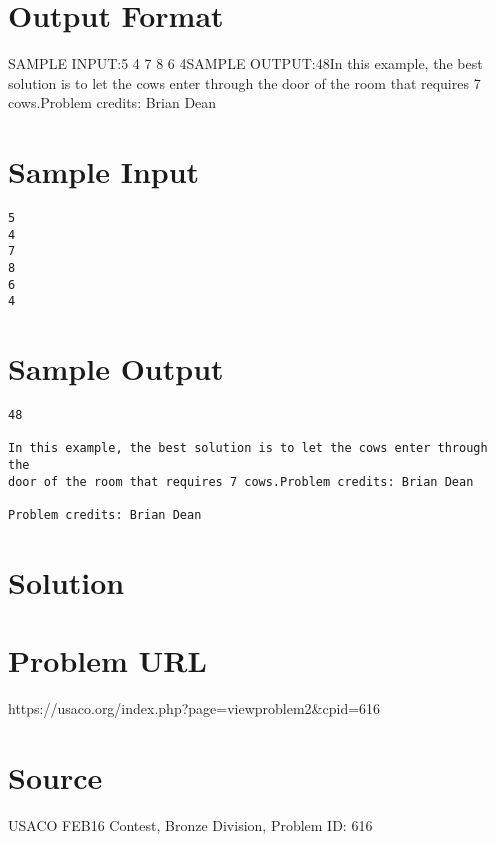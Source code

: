 \documentclass[12pt]{article}
\begin{document}
\section*{Output Format}
SAMPLE INPUT:5
4
7
8
6
4SAMPLE OUTPUT:48In this example, the best solution is to let the cows enter through the
door of the room that requires 7 cows.Problem credits: Brian Dean

\section*{Sample Input}
\begin{verbatim}
5
4
7
8
6
4
\end{verbatim}

\section*{Sample Output}
\begin{verbatim}
48

In this example, the best solution is to let the cows enter through the
door of the room that requires 7 cows.Problem credits: Brian Dean

Problem credits: Brian Dean
\end{verbatim}

\section*{Solution}


\section*{Problem URL}
https://usaco.org/index.php?page=viewproblem2&cpid=616

\section*{Source}
USACO FEB16 Contest, Bronze Division, Problem ID: 616
\end{document}
